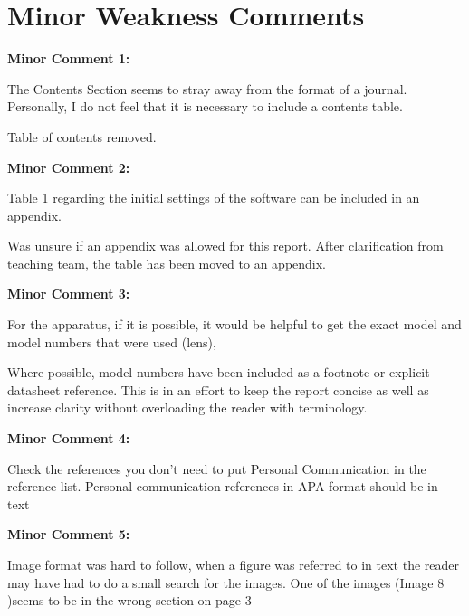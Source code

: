\documentclass[%
 aip,
cp,  %
 amsmath,amssymb,
 reprint,%
]{revtex4-2}
\begin{document}
        \section{Minor Weakness Comments}
        \begin{mdframed} \textbf{Minor Comment 1:}

            The Contents Section seems to stray away from the format of a journal. Personally, I do not feel that it is necessary to include a contents table.
        \end{mdframed}
        {\color{red}
        
        Table of contents removed.

        }
        \begin{mdframed} \textbf{Minor Comment 2:}

            Table 1 regarding the initial settings of the software can be included in an appendix.
        \end{mdframed}
        {\color{red}
        
        Was unsure if an appendix was allowed for this report. After clarification from teaching team, the table has been moved to an appendix.

        }
        \begin{mdframed} \textbf{Minor Comment 3:}

            For the apparatus, if it is possible, it would be helpful to get the exact model and model numbers that were used (lens),
        \end{mdframed}
        {\color{red}
        
        Where possible, model numbers have been included as a footnote or explicit datasheet reference. This is in an effort to keep the report concise as well as increase clarity without overloading the reader with terminology.

        }
        \begin{mdframed} \textbf{Minor Comment 4:}

            Check the references you don't need to put Personal Communication in the reference list. Personal communication references in APA format should be in-text
        \end{mdframed}
        {\color{red}
        
        

        }
        \begin{mdframed} \textbf{Minor Comment 5:}

            Image format was hard to follow, when a figure was referred to in text the reader may have had to do a small search for the images. One of the images (Image 8 )seems to be in the wrong section on page 3
        \end{mdframed}
\end{document}
